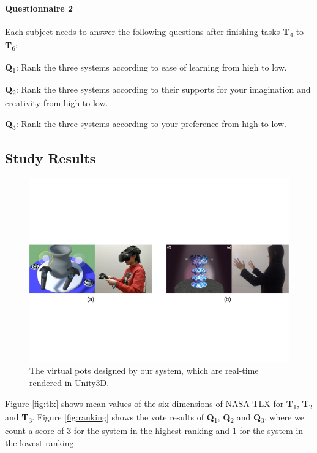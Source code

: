 \documentclass{svjour3}                     %
\begin{document}
\paragraph{Questionnaire 2} Each subject needs to answer the following questions after finishing tasks \textbf{T}\textsubscript{4} to \textbf{T}\textsubscript{6}:

\textbf{Q}\textsubscript{1}: Rank the three systems according to ease of learning from high to low.

\textbf{Q}\textsubscript{2}: Rank the three systems according to their supports for your imagination and creativity from high to low.

\textbf{Q}\textsubscript{3}: Rank the three systems according to your preference from high to low.


\subsection{Study Results}
\label{sec:6.4}

\begin{figure}
\includegraphics[width=\textwidth]{fig13}
\caption{The virtual pots designed by our system, which are real-time rendered in Unity3D.}
\label{fig:pots}
\end{figure}

Figure \ref{fig:tlx} shows mean values of the six dimensions of NASA-TLX for \textbf{T}\textsubscript{1}, \textbf{T}\textsubscript{2} and \textbf{T}\textsubscript{3}.
Figure \ref{fig:ranking} shows the vote results of \textbf{Q}\textsubscript{1}, \textbf{Q}\textsubscript{2} and \textbf{Q}\textsubscript{3}, where we count a score of 3 for the system in the highest ranking and 1 for the system in the lowest ranking. 
\end{document}
